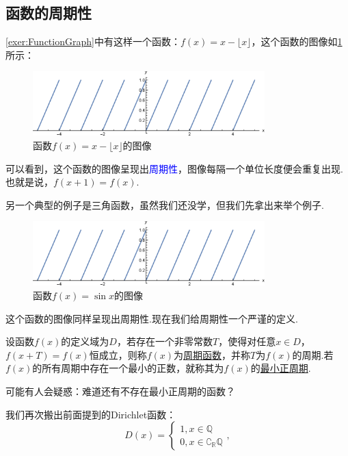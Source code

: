 \documentclass[lang=cn,math=cm,chinesefont=nofont,11pt,scheme=chinese,twocol]{elegantbook}
\begin{document}
\subsection{函数的周期性}

\ref{exer:FunctionGraph}中有这样一个函数：$f(x)=x-\lfloor x\rfloor$，这个函数的图像如\ref{2.2.4function1}所示：

\begin{figure}[h]
  \centering
  \includegraphics[width=0.8\textwidth]{image/2.2.4function1.eps}
  \caption{函数$f(x)=x-\lfloor x\rfloor$的图像}
  \label{2.2.4function1}
\end{figure}

可以看到，这个函数的图像呈现出\textcolor{blue}{周期性}，图像每隔一个单位长度便会重复出现.也就是说，$f(x+1)=f(x)$.

另一个典型的例子是三角函数，虽然我们还没学，但我们先拿出来举个例子.

\begin{figure}[h]
  \centering
  \includegraphics[width=0.8\textwidth]{image/2.2.4function1.eps}
  \caption{函数$f(x)=\sin x$的图像}
  \label{2.2.4function2}
\end{figure}

这个函数的图像同样呈现出周期性.现在我们给周期性一个严谨的定义.

\begin{definition}
  设函数$f(x)$的定义域为$D$，若存在一个非零常数$T$，使得对任意$x\in D$，$f(x+T)=f(x)$恒成立，则称$f(x)$为\underline{周期函数}，并称$T$为$f(x)$的周期.若$f(x)$的所有周期中存在一个最小的正数，就称其为$f(x)$的\underline{最小正周期}.
\end{definition}

可能有人会疑惑：难道还有不存在最小正周期的函数？

我们再次搬出前面提到的Dirichlet函数： 
$$D(x)=
\begin{cases}
  1,x\in\mathbb{Q}
  \\0,x\in\complement_{\mathbb{R}}\mathbb{Q}
\end{cases},$$
\end{document}
